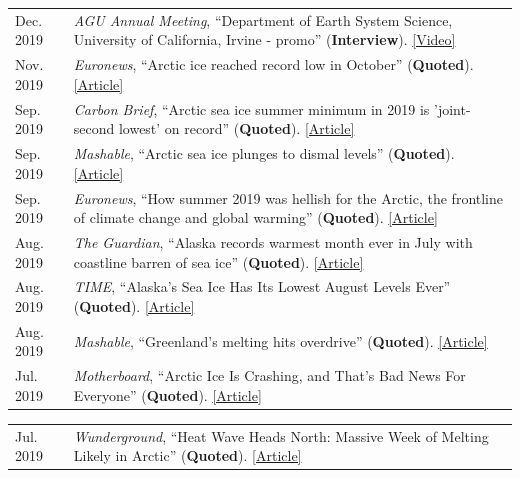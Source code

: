 \documentclass[margin,line,palatino,courier,10pt]{res}
\begin{document}
\begin{resume}
\begin{tabular}{@{}p{0.9in}p{4in}}
Dec. 2019 & \textit{AGU Annual Meeting}, ``Department of Earth System Science, University of California, Irvine - promo'' (\textbf{Interview}). \href{https://www.youtube.com/watch?v=QSDRbSkJeqg&feature=youtu.be}{[Video]}\\
Nov. 2019 & \textit{Euronews}, ``Arctic ice reached record low in October'' (\textbf{Quoted}). \href{https://www.euronews.com/2019/11/04/arctic-ice-reached-record-low-in-october}{[Article]}\\
Sep. 2019 & \textit{Carbon Brief}, ``Arctic sea ice summer minimum in 2019 is 'joint-second lowest' on record'' (\textbf{Quoted}). \href{https://www.carbonbrief.org/arctic-sea-ice-minimum-in-2019-is-joint-second-lowest-on-record}{[Article]}\\
Sep. 2019 & \textit{Mashable}, ``Arctic sea ice plunges to dismal levels'' (\textbf{Quoted}). \href{https://mashable.com/article/arctic-sea-ice-2019-melt/}{[Article]}\\
Sep. 2019 & \textit{Euronews}, ``How summer 2019 was hellish for the Arctic, the frontline of climate change and global warming'' (\textbf{Quoted}). \href{https://www.euronews.com/2019/09/18/how-2019-was-hellish-for-the-arctic-the-frontline-of-climate-change-and-global-warming}{[Article]}\\
Aug. 2019 & \textit{The Guardian}, ``Alaska records warmest month ever in July with coastline barren of sea ice'' (\textbf{Quoted}). \href{https://www.theguardian.com/us-news/2019/aug/08/alaska-warmest-month-ever-july-2019-sea-ice}{[Article]}\\
Aug. 2019 & \textit{TIME}, ``Alaska's Sea Ice Has Its Lowest August Levels Ever'' (\textbf{Quoted}). \href{https://time.com/5646168/alaska-sea-ice-melted/}{[Article]}\\
Aug. 2019 & \textit{Mashable}, ``Greenland's melting hits overdrive'' (\textbf{Quoted}). \href{https://mashable.com/article/greenland-melting-spike-climate-change/}{[Article]}\\
Jul. 2019 & \textit{Motherboard}, ``Arctic Ice Is Crashing, and That's Bad News For Everyone'' (\textbf{Quoted}). \href{https://www.vice.com/en_us/article/qv7gzm/arctic-ice-is-crashing-and-thats-bad-news-for-everyone}{[Article]}\\
\end{tabular}
\begin{tabular}{@{}p{0.9in}p{4in}}
Jul. 2019 & \textit{Wunderground}, ``Heat Wave Heads North: Massive Week of Melting Likely in Arctic'' (\textbf{Quoted}). \href{https://www.wunderground.com/cat6/Heat-Wave-Heads-North-Massive-Week-Melting-Likely-Arctic}{[Article]}\\

\end{tabular}
\end{resume}
\end{document}
